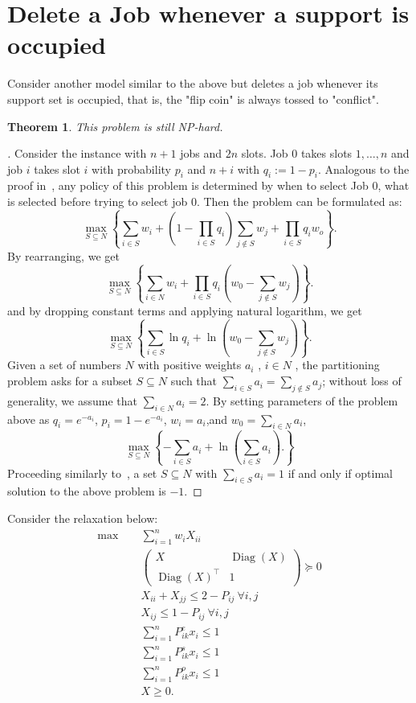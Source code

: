 \documentclass{article}
\newtheorem{theorem}{Theorem}[section]
\newcommand{\Diag}{\operatorname{Diag}}
\begin{document}
\section{Delete a Job whenever a support is occupied}
Consider another model similar to the above but deletes a job whenever its support set is occupied, that is, the "flip coin" is always tossed to "conflict".
\begin{theorem}
    This problem is still NP-hard.
\end{theorem}
\begin{proof}[\cite{DNP}]
    Consider the instance with $n+1$ jobs and $2n$ slots. 
    Job $0$ takes slots $1,\ldots,n$ and job $i$ takes slot $i$ with probability $p_i$ and $n+i$ with $q_i:=1-p_i$.
    Analogous to the proof in~\cite{DNP}, any policy of this problem is determined by when to select Job $0$, what is selected before trying to select job $0$.
    Then the problem can be formulated as:
    \begin{equation}
    \label{Conserv-JS}
    \tag{Conserv-JS}
    \max_{S\subseteq N}\left\{\sum_{i\in S}w_i+(1-\prod_{i\in S}q_i)\sum_{j\notin S}w_j+\prod_{i\in S}q_iw_o\right\}.
    \end{equation}
    By rearranging, we get 
    \[\max_{S\subseteq N}\left\{\sum_{i\in N}w_i+\prod_{i\in S}q_i(w_0-\sum_{j\notin S}w_j)\right\}.\]
    and by dropping constant terms and applying natural logarithm, we get 
    \[\max_{S\subseteq N}\left\{\sum_{i\in S}\ln q_i+\ln(w_0-\sum_{j\notin S}w_j)\right\}.\]
    Given a set of numbers $N$ with positive weights $a_i$ , $i \in N$ , the partitioning problem asks for a subset $S \subseteq N$ such that $\sum_{i\in S}a_i = \sum_{j\notin S} a_j$; without loss of generality, we assume that $\sum_{i\in N} a_i = 2$.
    By setting parameters of the problem above as $q_i = e^{-a_i}$, $p_i = 1-e^{-a_i}$, $w_i =a_i$,and $w_0 = \sum_{i\in N} a_i$,
    \[\max_{S\subseteq N}\left\{-\sum_{i\in S}a_i+\ln(\sum_{i \in S}a_i).\right\}\]
    Proceeding similarly to~\cite{Star-Graph-NP-hard}, a set $S \subseteq N$ with $\sum_{i\in S}a_i=1$ if and only if 
optimal solution to the above problem is $-1$.
\end{proof}
Consider the relaxation below:
\begin{align*}
    \max\quad~&\sum_{i=1}^{n}w_iX_{ii}\\
    &\begin{pmatrix}
        X &\Diag(X)\\
        \Diag(X)^\top &1
    \end{pmatrix}\succeq 0\\
    &X_{ii}+X_{jj}\leq 2-P_{ij}~\forall i,j\\
    &X_{ij}\leq 1-P_{ij}~\forall i,j\\
    & \sum_{i=1}^{n}P_{ik}^e x_i\leq1\\
    & \sum_{i=1}^{n}P_{ik}^s x_i\leq1\\
    & \sum_{i=1}^{n}P_{ik}^o x_i\leq1\\
    &X\geq 0.
\end{align*}
\end{document}
